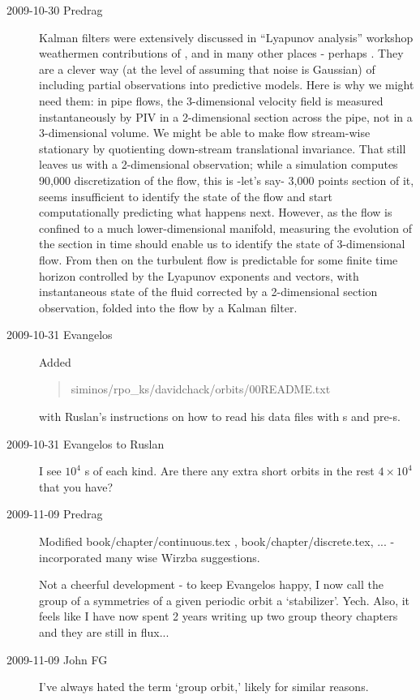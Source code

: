 \begin{description}
\item[2009-10-30 Predrag]
Kalman filters were extensively discussed in ``Lyapunov analysis''
workshop weathermen contributions of , and in many other
places - perhaps . They are a clever way (at the level of assuming that
noise is Gaussian) of including partial observations into predictive
models. Here is why we might need them: in pipe flows, the 3-dimensional
velocity field is measured instantaneously by PIV in a 2-dimensional
section across the pipe, not in a 3-dimensional volume. We might be able
to make flow stream-wise stationary by quotienting down-stream
translational invariance. That still leaves us with a 2-dimensional
observation; while a simulation computes 90,000 discretization of the
flow, this is -let's say- 3,000 points section of it, seems insufficient
to identify the state of the flow and start computationally predicting
what happens next. However, as the flow is confined to a much
lower-dimensional manifold, measuring the evolution of the section in
time should enable us to identify the state of 3-dimensional flow. From
then on the turbulent flow is predictable for some finite time horizon
controlled by the Lyapunov exponents and vectors, with instantaneous
state of the fluid corrected by a 2-dimensional section observation,
folded into the flow by a Kalman filter.

\item[2009-10-31 Evangelos] Added
\begin{quote}
    siminos/rpo\_ks/davidchack/orbits/00README.txt
\end{quote}
    with Ruslan's instructions on how to read his data
    files with \rpo s and pre-\po s.

\item[2009-10-31 Evangelos to Ruslan] I see $10^4$ \rpo s
    of each kind. Are there any extra short orbits in the
    rest $4 \times 10^4$ that you have?

\item[2009-11-09 Predrag]
Modified
  book/chapter/continuous.tex ,
  book/chapter/discrete.tex, ...
- incorporated many wise Wirzba suggestions.

Not a cheerful development - to keep Evangelos happy, I now call the
 group of a symmetries of a given periodic orbit a `stabilizer'. Yech.
 Also, it feels like I have now spent 2 years writing up two group theory
 chapters and they are still in flux...

\item[2009-11-09 John FG]
    I've always hated the term `group orbit,' likely for similar reasons.


\end{description}
